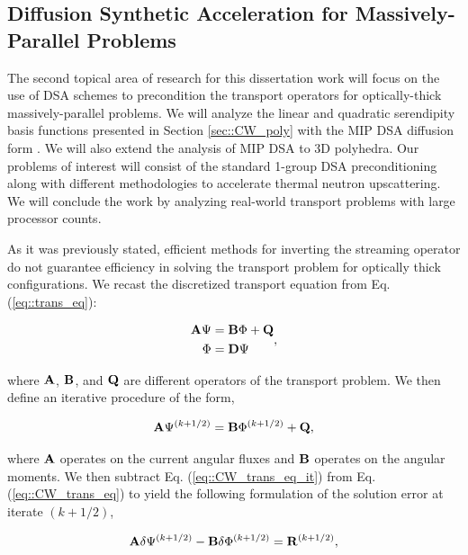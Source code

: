 \documentclass[11pt]{article}
\begin{document}
\subsection{Diffusion Synthetic Acceleration for Massively-Parallel Problems}
\label{sec::CW_DSA}

The second topical area of research for this dissertation work will focus on the use of DSA schemes to precondition the transport operators for optically-thick massively-parallel problems. We will analyze the linear and quadratic serendipity basis functions presented in Section \ref{sec::CW_poly} with the MIP DSA diffusion form \cite{ref::DSA_wang_ragusa,wang2009adaptive,turcksin2014discontinuous}. We will also extend the analysis of MIP DSA to 3D polyhedra. Our problems of interest will consist of the standard 1-group DSA preconditioning along with different methodologies to accelerate thermal neutron upscattering. We will conclude the work by analyzing real-world transport problems with large processor counts.

As it was previously stated, efficient methods for inverting the streaming operator do not guarantee efficiency in solving the transport problem for optically thick configurations. We recast the discretized transport equation from Eq. (\ref{eq::trans_eq}):

\begin{equation}
\label{eq::CW_trans_eq}
\begin{aligned}
{\bf A} \Psi &= {\bf B} \Phi + {\bf Q} \\
\Phi &= {\bf D} \Psi
\end{aligned} ,
\end{equation}

\noindent where ${\bf A}$, ${\bf B}$, and ${\bf Q}$ are different operators of the transport problem. We then define an iterative procedure of the form,

\begin{equation}
\label{eq::CW_trans_eq_it}
{\bf A} \Psi^{(k+1/2)} = {\bf B} \Phi^{(k+1/2)}+ {\bf Q},
\end{equation}

\noindent where ${\bf A}$ operates on the current angular fluxes and ${\bf B}$ operates on the angular moments. We then subtract Eq. (\ref{eq::CW_trans_eq_it}) from Eq. (\ref{eq::CW_trans_eq}) to yield the following formulation of the solution error at iterate $(k+1/2)$,

\begin{equation}
\label{eq::CW_trans_eq_it_diff}
{\bf A} \delta \Psi^{(k+1/2)} - {\bf B} \delta \Phi^{(k+1/2)} = {\bf R}^{(k+1/2)}, 
\end{equation}
\end{document}
